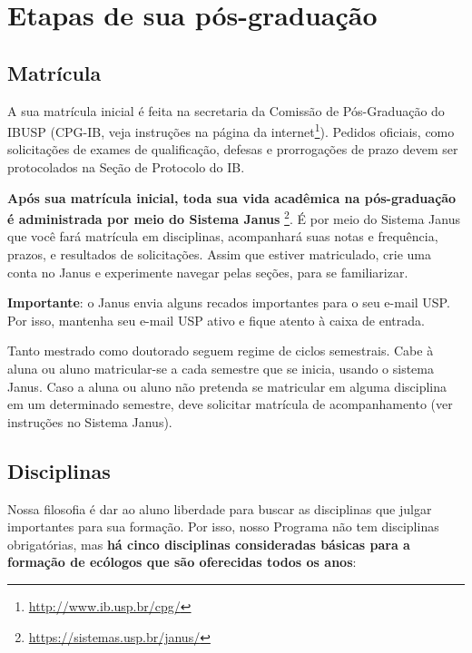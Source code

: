 \documentclass[twoside a4paper 12pt]{report}
\begin{document}
\chapter{Etapas de sua pós-graduação}

\section{Matrícula}

A sua matrícula inicial é feita na secretaria da Comissão de
Pós-Graduação do IBUSP (CPG-IB, veja instruções na página da
internet\footnote{\url{http://www.ib.usp.br/cpg/}}). Pedidos oficiais,
como solicitações de exames de qualificação, defesas e prorrogações de
prazo devem ser protocolados na Seção de Protocolo do IB.

\textbf{Após sua matrícula inicial, toda sua vida acadêmica na
  pós-graduação é administrada por meio do Sistema Janus}
\footnote{\url{https://sistemas.usp.br/janus/}}. É por meio do Sistema
Janus que você fará matrícula em disciplinas, acompanhará suas notas e
frequência, prazos, e resultados de solicitações. Assim que estiver
matriculado, crie uma conta no Janus e experimente navegar pelas
seções, para se familiarizar.

\textbf{Importante}: o Janus envia alguns recados importantes para o
seu e-mail USP. Por isso, mantenha seu e-mail USP ativo e fique atento
à caixa de entrada.

Tanto mestrado como doutorado seguem regime de ciclos semestrais. Cabe
à aluna ou aluno matricular-se a cada semestre que se inicia, usando o
sistema Janus. Caso a aluna ou aluno não pretenda se matricular em
alguma disciplina em um determinado semestre, deve solicitar matrícula
de acompanhamento (ver instruções no Sistema Janus).

\section{Disciplinas}
\label{sec:disciplinas}

Nossa filosofia é dar ao aluno liberdade para buscar as disciplinas que julgar importantes para sua formação. Por isso, nosso Programa não tem disciplinas obrigatórias, mas \textbf{há cinco disciplinas consideradas básicas para a formação de ecólogos que são oferecidas todos os anos}:
\end{document}
